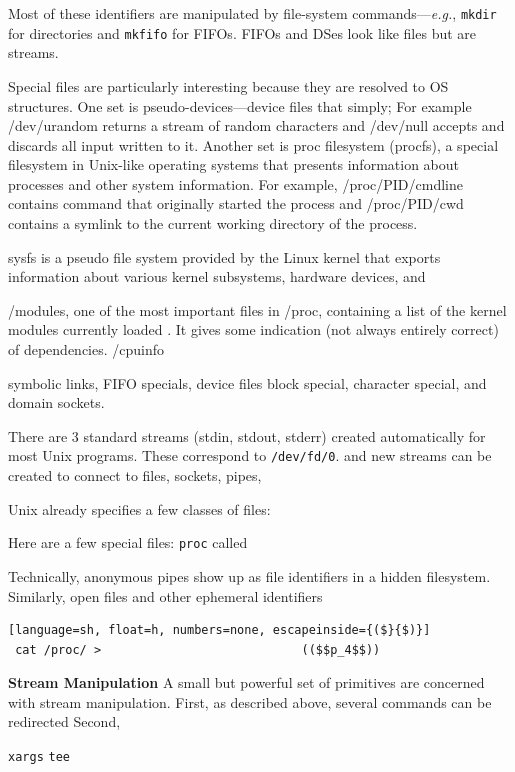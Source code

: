 \documentclass[sigplan,10pt,review,anonymous]{acmart}
\newcommand{\eg}{{\em e.g.}, }
\newcommand{\heading}[1]{\vspace{4pt}\noindent\textbf{#1}\enspace}
\newcommand{\ttt}[1]{\texttt{\small #1}}
\begin{document}
Most of these identifiers are manipulated by file-system commands---\eg \ttt{mkdir} for directories and \ttt{mkfifo} for FIFOs.
FIFOs and DSes look like files but are streams.

Special files are particularly interesting because they are resolved to OS structures.
One set is pseudo-devices---device files that simply;
For example /dev/urandom returns a stream of random characters and /dev/null accepts and discards all input written to it.
Another set is proc filesystem (procfs), a special filesystem in Unix-like operating systems that presents information about processes and other system information.
For example, /proc/PID/cmdline contains command that originally started the process and /proc/PID/cwd contains a symlink to the current working directory of the process.

sysfs is a pseudo file system provided by the Linux kernel that exports information about various kernel subsystems, hardware devices, and 

/modules, one of the most important files in /proc, containing a list of the kernel modules currently loaded . It gives some indication (not always entirely correct) of dependencies.
/cpuinfo

symbolic links, FIFO specials, 
device files
block special, character special, 
and domain sockets.

There are 3 standard streams (stdin, stdout, stderr) created automatically for most Unix programs.
These correspond to \ttt{/dev/fd/0}.
and new streams can be created to connect to files, sockets, pipes,

Unix already specifies a few classes of files:

Here are a few special files:
  \ttt{proc} called 

Technically, anonymous pipes show up as file identifiers in a hidden filesystem.
Similarly, open files and other ephemeral identifiers 


\begin{lstlisting}[language=sh, float=h, numbers=none, escapeinside={($}{$)}]
 cat /proc/ >                            (($$p_4$$))
\end{lstlisting}

\heading{Stream Manipulation}
A small but powerful set of primitives are concerned with stream manipulation.
First, as described above, several commands can be redirected
Second, 

\ttt{xargs}
\ttt{tee}
\end{document}

